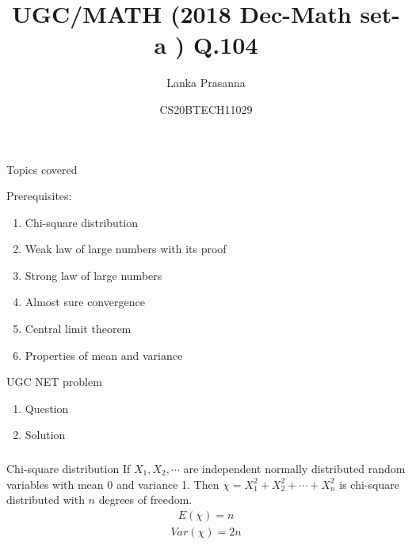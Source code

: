\documentclass{beamer}
\title{UGC/MATH (2018 Dec-Math set-a ) Q.104}
\author{Lanka Prasanna}
\date{CS20BTECH11029}
\begin{document}
\begin{frame}
\titlepage
\end{frame}
\begin{frame}{Topics covered}
\begin{block}{Prerequisites:}
\begin{enumerate}[]
\item Chi-square distribution
\item Weak law of large numbers with its proof
\item Strong law of large numbers
\item Almost sure convergence
\item Central limit theorem
\item Properties of mean and variance
\end{enumerate}
\end{block}
\begin{block}{UGC NET problem}
\begin{enumerate}[]
 \item Question
\item Solution 
\end{enumerate}
\end{block}


\end{frame}
\begin{frame}
\frametitle{}
\begin{block}{Chi-square distribution}
If $X_1,X_2,\cdots$ are independent normally distributed random variables with mean 0 and variance 1. Then $\chi=X_{1}^2+X_{2}^2+\cdots+X_{n}^2$ is chi-square distributed with $n$ degrees of freedom.
\begin{align}
    E(\chi)=n \label{eq:x2}
\end{align}
\begin{align}
    Var(\chi)=2n\label{eq:x10}
\end{align}\label{lem}
\end{block}
\end{frame}
\end{document}

